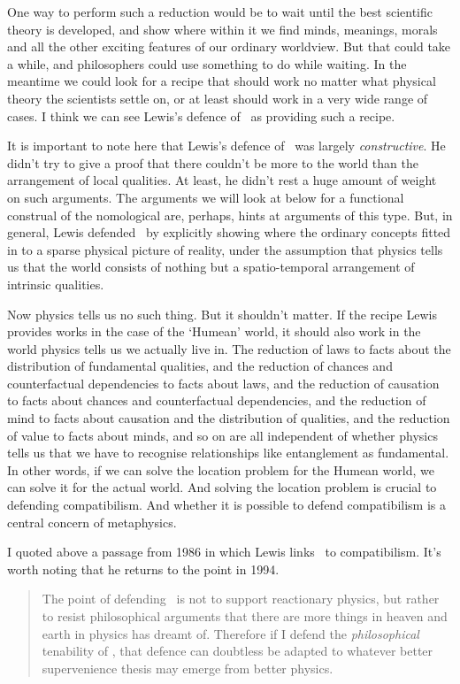 One way to perform such a reduction would be to wait until the best scientific theory is developed, and show where within it we find minds, meanings, morals and all the other exciting features of our ordinary worldview. But that could take a while, and philosophers could use something to do while waiting. In the meantime we could look for a recipe that should work no matter what physical theory the scientists settle on, or at least should work in a very wide range of cases. I think we can see Lewis's defence of \HS\ as providing such a recipe.

It is important to note here that Lewis's defence of \HS\ was largely \textit{constructive}. He didn't try to give a proof that there couldn't be more to the world than the arrangement of local qualities. At least, he didn't rest a huge amount of weight on such arguments. The arguments we will look at below for a functional construal of the nomological are, perhaps, hints at arguments of this type. But, in general, Lewis defended \HS\ by explicitly showing where the ordinary concepts fitted in to a sparse physical picture of reality, under the assumption that physics tells us that the world consists of nothing but a spatio-temporal arrangement of intrinsic qualities.

Now physics tells us no such thing. But it shouldn't matter. If the recipe Lewis provides works in the case of the `Humean' world, it should also work in the world physics tells us we actually live in.  The reduction of laws to facts about the distribution of fundamental qualities, and the reduction of chances and counterfactual dependencies to facts about laws,  and the reduction of causation to facts about chances and counterfactual dependencies, and the reduction of mind to facts about causation and the distribution of qualities, and the reduction of value to facts about minds, and so on  are all independent of whether physics tells us that we have to recognise relationships like entanglement as fundamental. In other words, if we can solve the location problem for the Humean world,  we can solve it for the actual world. And solving the location problem is crucial to defending compatibilism. And whether it is possible to defend compatibilism is a central concern of metaphysics.

I quoted above a passage from 1986 in which Lewis links \HS\ to compatibilism. It's worth noting that he returns to the point in 1994.

\begin{quote}
 The point of defending \HS\  is not to support react\-ionary physics, but rather to resist philosophical arguments that there are more things in heaven and earth in physics has dreamt of.  Therefore if I defend the \textit{philosophical}  tenability of \HS,  that defence can doubtless be adapted to whatever better supervenience thesis may emerge from better physics. \citep[474]{Lewis1994a}
\end{quote}

